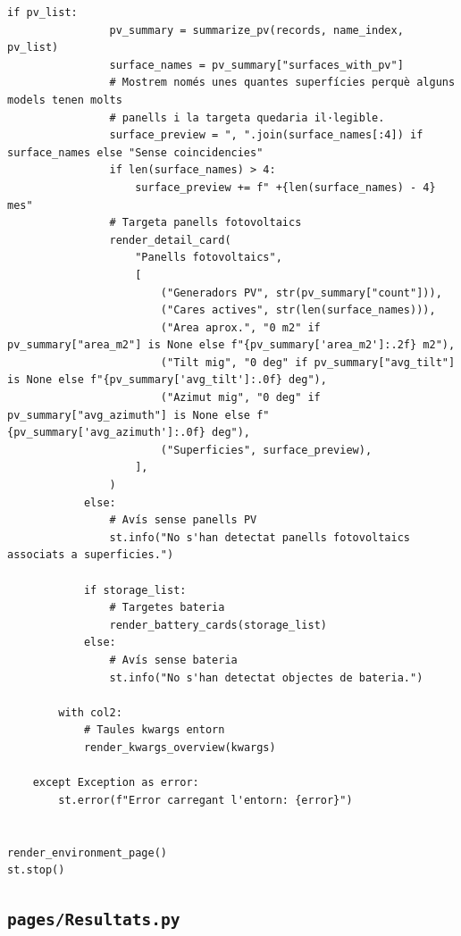 \documentclass[10pt,a4paper]{article}
\begin{document}
\begin{lstlisting}[style=studioPython,caption={pages/Mostrar\_Entorn.py},label={lst:pages-mostrar-entorn-py}]
            if pv_list:
                pv_summary = summarize_pv(records, name_index, pv_list)
                surface_names = pv_summary["surfaces_with_pv"]
                # Mostrem només unes quantes superfícies perquè alguns models tenen molts
                # panells i la targeta quedaria il·legible.
                surface_preview = ", ".join(surface_names[:4]) if surface_names else "Sense coincidencies"
                if len(surface_names) > 4:
                    surface_preview += f" +{len(surface_names) - 4} mes"
                # Targeta panells fotovoltaics
                render_detail_card(
                    "Panells fotovoltaics",
                    [
                        ("Generadors PV", str(pv_summary["count"])),
                        ("Cares actives", str(len(surface_names))),
                        ("Area aprox.", "0 m2" if pv_summary["area_m2"] is None else f"{pv_summary['area_m2']:.2f} m2"),
                        ("Tilt mig", "0 deg" if pv_summary["avg_tilt"] is None else f"{pv_summary['avg_tilt']:.0f} deg"),
                        ("Azimut mig", "0 deg" if pv_summary["avg_azimuth"] is None else f"{pv_summary['avg_azimuth']:.0f} deg"),
                        ("Superficies", surface_preview),
                    ],
                )
            else:
                # Avís sense panells PV
                st.info("No s'han detectat panells fotovoltaics associats a superficies.")

            if storage_list:
                # Targetes bateria
                render_battery_cards(storage_list)
            else:
                # Avís sense bateria
                st.info("No s'han detectat objectes de bateria.")

        with col2:
            # Taules kwargs entorn
            render_kwargs_overview(kwargs)

    except Exception as error:
        st.error(f"Error carregant l'entorn: {error}")


render_environment_page()
st.stop()
\end{lstlisting}


\subsection{\texorpdfstring{\texttt{pages/Resultats.py}}{pages/Resultats.py}}
\end{document}
